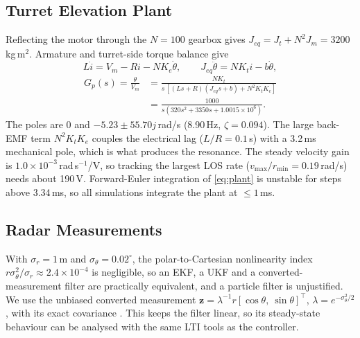 \documentclass[conference]{IEEEtran}
\begin{document}
\subsection{Turret Elevation Plant}
Reflecting the motor through the $N=100$ gearbox gives $J_{eq}=J_t+N^2J_m=3200$\,kg\,m$^2$. Armature and turret-side torque balance give
\begin{equation}
L\dot i = V_m - Ri - NK_e\dot\theta,\qquad J_{eq}\ddot\theta = NK_ti - b\dot\theta,
\end{equation}
\begin{equation}
\begin{aligned}
G_p(s)=\frac{\theta}{V_m}&=\frac{NK_t}{s\,[(Ls+R)(J_{eq}s+b)+N^2K_tK_e]}\\
&=\frac{1000}{s(320s^2+3350s+1.0015{\times}10^6)}.
\end{aligned}
\label{eq:plant}
\end{equation}
The poles are $0$ and $-5.23\pm55.70j$\,rad/s (8.90\,Hz, $\zeta=0.094$). The large back-EMF term $N^2K_tK_e$ couples the electrical lag ($L/R=0.1$\,s) with a 3.2\,ms mechanical pole, which is what produces the resonance. The steady velocity gain is $1.0\times10^{-3}$\,rad\,s$^{-1}$/V, so tracking the largest LOS rate ($v_{\max}/r_{\min}=0.19$\,rad/s) needs about 190\,V. Forward-Euler integration of \eqref{eq:plant} is unstable for steps above 3.34\,ms, so all simulations integrate the plant at $\le1$\,ms.

\subsection{Radar Measurements}
With $\sigma_r=1$\,m and $\sigma_\theta=0.02^\circ$, the polar-to-Cartesian nonlinearity index $r\sigma_\theta^2/\sigma_r\approx2.4\times10^{-4}$ is negligible, so an EKF, a UKF and a converted-measurement filter are practically equivalent, and a particle filter is unjustified. We use the unbiased converted measurement $\mathbf z=\lambda^{-1}r[\cos\theta,\ \sin\theta]^\top$, $\lambda=e^{-\sigma_\theta^2/2}$, with its exact covariance \cite{mo1998unbiased}. This keeps the filter linear, so its steady-state behaviour can be analysed with the same LTI tools as the controller.
\end{document}
